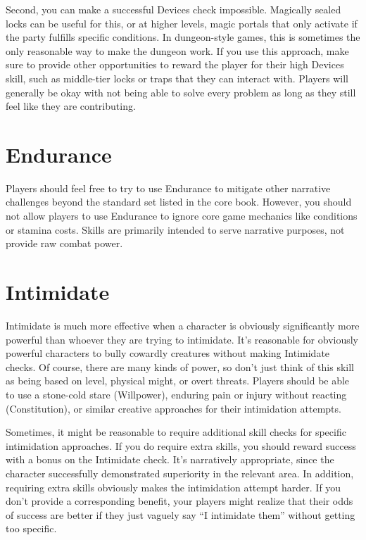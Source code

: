   Second, you can make a successful Devices check impossible.
  Magically sealed locks can be useful for this, or at higher levels, magic portals that only activate if the party fulfills specific conditions.
  In dungeon-style games, this is sometimes the only reasonable way to make the dungeon work.
  If you use this approach, make sure to provide other opportunities to reward the player for their high Devices skill, such as middle-tier locks or traps that they can interact with.
  Players will generally be okay with not being able to solve every problem as long as they still feel like they are contributing.

\section{Endurance}\label{Endurance}
  Players should feel free to try to use Endurance to mitigate other narrative challenges beyond the standard set listed in the core book.
  However, you should not allow players to use Endurance to ignore core game mechanics like conditions or stamina costs.
  Skills are primarily intended to serve narrative purposes, not provide raw combat power.

\section{Intimidate}\label{Intimidate}

  Intimidate is much more effective when a character is obviously significantly more powerful than whoever they are trying to intimidate.
  It's reasonable for obviously powerful characters to bully cowardly creatures without making Intimidate checks.
  Of course, there are many kinds of power, so don't just think of this skill as being based on level, physical might, or overt threats.
  Players should be able to use a stone-cold stare (Willpower), enduring pain or injury without reacting (Constitution), or similar creative approaches for their intimidation attempts.

  Sometimes, it might be reasonable to require additional skill checks for specific intimidation approaches.
  If you do require extra skills, you should reward success with a bonus on the Intimidate check.
  It's narratively appropriate, since the character successfully demonstrated superiority in the relevant area.
  In addition, requiring extra skills obviously makes the intimidation attempt harder.
  If you don't provide a corresponding benefit, your players might realize that their odds of success are better if they just vaguely say ``I intimidate them'' without getting too specific.

